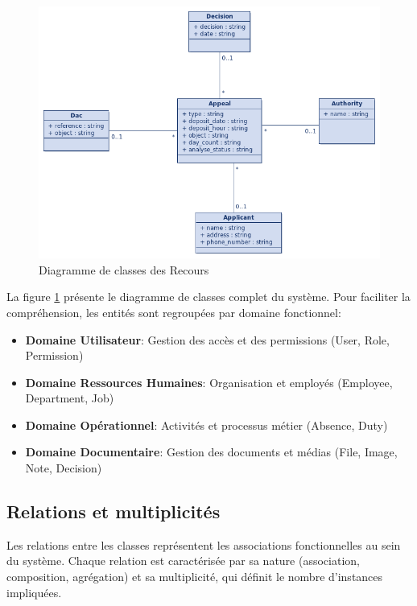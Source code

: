 \begin{figure}[H]
    \centering
    \includegraphics[width=\textwidth]{images/diagrammes/class/Diagramme de classe recours.png}
    \caption{Diagramme de classes des Recours}
    \label{fig:class_diagram_improved}
\end{figure}

La figure \ref{fig:class_diagram_improved} présente le diagramme de classes complet du système. Pour faciliter la compréhension, les entités sont regroupées par domaine fonctionnel:

\begin{itemize}
    \item \textbf{Domaine Utilisateur}: Gestion des accès et des permissions (User, Role, Permission)
    \item \textbf{Domaine Ressources Humaines}: Organisation et employés (Employee, Department, Job)
    \item \textbf{Domaine Opérationnel}: Activités et processus métier (Absence, Duty)
    \item \textbf{Domaine Documentaire}: Gestion des documents et médias (File, Image, Note, Decision)
\end{itemize}

\subsection{Relations et multiplicités}
Les relations entre les classes représentent les associations fonctionnelles au sein du système. Chaque relation est caractérisée par sa nature (association, composition, agrégation) et sa multiplicité, qui définit le nombre d'instances impliquées.

